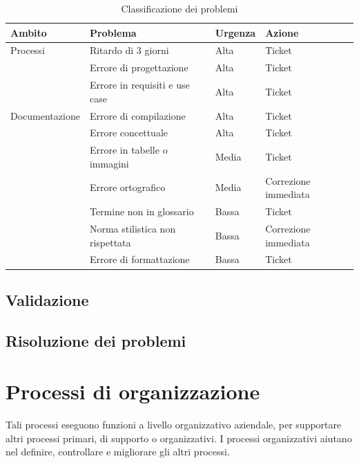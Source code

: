 \documentclass[12pt,a4paper]{article}
\begin{document}
\begin{table}[H]
	\begin{tabular}{p{} p{} p{} p{}}
		\toprule
		\textbf{Ambito}	&	\textbf{Problema}	&	\textbf{Urgenza}	&	\textbf{Azione}\\
		\midrule
		\midrule
		Processi & Ritardo di 3 giorni & Alta & Ticket \\
		\midrule
		& Errore di progettazione & Alta & Ticket \\
		\midrule
		& Errore in requisiti e use case & Alta & Ticket \\
		\midrule
		\midrule
		Documentazione & Errore di compilazione & Alta & Ticket \\
		\midrule
		& Errore concettuale & Alta & Ticket \\
		\midrule
		& Errore in tabelle o immagini & Media & Ticket \\
		\midrule
		& Errore ortografico & Media & Correzione immediata \\
		\midrule
		& Termine non in glossario & Bassa & Ticket \\
		\midrule
		& Norma stilistica non rispettata & Bassa & Correzione immediata \\
		\midrule
		& Errore di formattazione & Bassa & Ticket \\
		\bottomrule
	\end{tabular}
	\caption{Classificazione dei problemi}
	\label{tabCalssificazioneProb}
\end{table}

\subsection{Validazione}

\subsection{Risoluzione dei problemi}

\newpage

\section{Processi di organizzazione}
Tali processi eseguono funzioni a livello organizzativo aziendale, per supportare altri processi primari, di supporto o organizzativi.
I processi organizzativi aiutano nel definire, controllare e migliorare gli altri processi.
\end{document}
